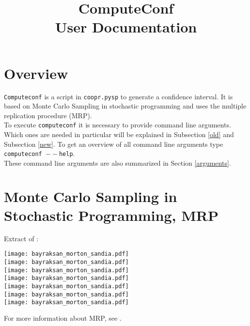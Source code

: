 \documentclass[a4paper]{article}
\begin{document}
\pagestyle{plain}

\title{ComputeConf\\User Documentation}
\maketitle


\section{Overview}
\texttt{Computeconf} is a script in \texttt{coopr.pysp} to generate a confidence interval. It is based on Monte Carlo Sampling in stochastic programming and uses the multiple replication procedure (MRP).\\
To execute \texttt{computeconf} it is necessary to provide command line arguments. Which ones are needed in particular will be explained in Subsection \ref{old} and Subsection \ref{new}. To get an overview of all command line arguments type \\
\texttt{computeconf $--$help}. \\
These command line arguments are also summarized in Section \ref{arguments}.


\section{Monte Carlo Sampling in Stochastic Programming, MRP}
Extract of \cite{MonteCarlo}:

\texttt{[image: bayraksan\_morton\_sandia.pdf]}\\
\texttt{[image: bayraksan\_morton\_sandia.pdf]}\\
\texttt{[image: bayraksan\_morton\_sandia.pdf]}\\
\texttt{[image: bayraksan\_morton\_sandia.pdf]}\\
\texttt{[image: bayraksan\_morton\_sandia.pdf]}\\
\texttt{[image: bayraksan\_morton\_sandia.pdf]}\\
\texttt{[image: bayraksan\_morton\_sandia.pdf]}

For more information about MRP, see \cite{MRP}.
\end{document}
